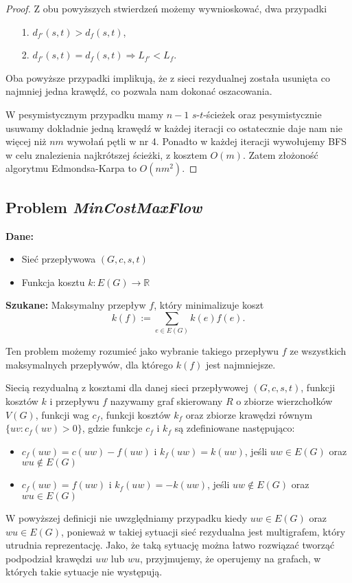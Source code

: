 \begin{theorem}
\begin{proof}
		Z obu powyższych stwierdzeń możemy wywnioskować, dwa przypadki
		\begin{itemize}
			\item[1.] $d_{f'}(s, t) > d_f(s, t)$,
			\item[2.] $d_{f'}(s, t) = d_f(s, t) \Rightarrow 
			L_{f'} < L_f$.
		\end{itemize}
		Oba powyższe przypadki implikują, że z sieci rezydualnej została 
		usunięta co najmniej jedna krawędź, co pozwala nam 
		dokonać oszacowania.
		
		W pesymistycznym przypadku mamy $n-1$ $s$-$t$-ścieżek oraz 
		pesymistycznie usuwamy dokładnie jedną krawędź w każdej iteracji
		co ostatecznie daje nam nie więcej niż $nm$ wywołań pętli w nr 4.
		Ponadto w każdej iteracji wywołujemy BFS w celu znalezienia najkrótszej
		ścieżki, z kosztem $O(m)$. Zatem złożoność algorytmu Edmondsa-Karpa
		to $O(nm^2)$.  \qedhere
		
	\end{proof}
\end{theorem}

\subsection{Problem \textit{MinCostMaxFlow}}
\textbf{Dane:}
\begin{itemize}[noitemsep, nolistsep]
	\item Sieć przepływowa $(G, c, s, t)$
	\item Funkcja kosztu $k : E(G) \to \mathbb{R}$
\end{itemize}

\textbf{Szukane:}
Maksymalny przepływ $f$, który minimalizuje koszt 
\[k(f) := \sum_{e\in E(G)}k(e)f(e).\]

Ten problem możemy rozumieć jako wybranie takiego przepływu $f$ 
ze wszystkich maksymalnych przepływów, dla którego
$k(f)$ jest najmniejsze. 

\begin{defi}
	Siecią rezydualną z kosztami dla danej sieci przepływowej
	$(G, c, s, t)$, funkcji kosztów $k$ i przepływu $f$ nazywamy
	graf skierowany $R$ o zbiorze wierzchołków $V(G)$, funkcji
	wag $c_f$, funkcji kosztów $k_f$ oraz zbiorze 
	krawędzi równym $\{ uv: c_f(uv) > 0\}$, gdzie funkcje 
	$c_f$ i $k_f$ są zdefiniowane następująco:
	\begin{itemize}
		\item $c_f(uw) = c(uw) - f(uw)$ i $k_f(uw) = k(uw)$,
		jeśli $uw \in E(G)$ oraz $wu \not \in E(G)$
		\item $c_f(uw) = f(uw)$ i $k_f(uw) = -k(uw)$,
		jeśli $uw \not \in E(G)$ oraz $wu \in E(G)$
	\end{itemize} 
\end{defi}
W powyższej definicji nie uwzględniamy przypadku kiedy 
$uw \in E(G)$ oraz $wu \in E(G)$, ponieważ w takiej sytuacji
sieć rezydualna jest multigrafem, który utrudnia reprezentację. 
Jako, że taką sytuację można łatwo rozwiązać tworząć podpodział
krawędzi $uw$ lub $wu$, przyjmujemy, że operujemy na grafach,
w których takie sytuacje nie występują.

